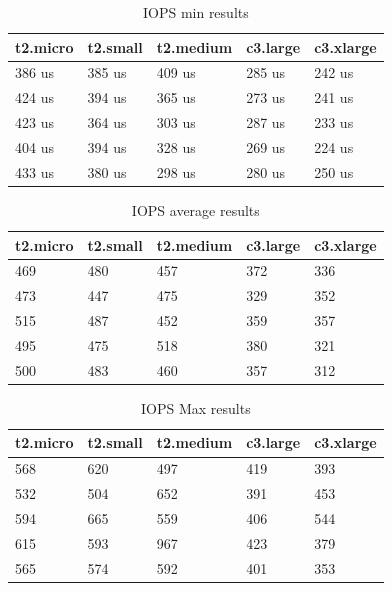 \documentclass[10pt, conference]{IEEEtran}
\begin{document}
\begin{center}
\begin{table}
\begin{center}
\begin{tabular}{|l|l|l|l|l|}
  \hline
t2.micro & t2.small & t2.medium & c3.large & c3.xlarge \\
\hline
386 us	& 385 us & 409 us & 285 us & 242 us \\
424 us & 394 us & 365 us & 273 us & 241 us \\
423 us & 	364 us & 303 us & 287 us & 233 us \\
404 us & 	394 us & 328 us & 269 us & 224 us \\
433 us & 	380 us & 298 us & 280 us & 250 us \\
\hline
\end{tabular}
\caption{\label{IOPSResultsMin} IOPS min results}
\end{center}
\end{table}
\end{center}

\begin{center}
\begin{table}
\begin{center}
\begin{tabular}{|l|l|l|l|l|}
  \hline
t2.micro & t2.small & 	t2.medium & 	c3.large & 	c3.xlarge \\
\hline 
469 & 	480 & 	457 & 	372 & 	336 \\
473 & 	447 & 	475 & 	329 & 	352 \\
515 & 	487 & 	452 & 	359 & 	357 \\
495 & 	475 & 	518 & 	380 & 	321 \\
500 & 	483 & 	460 & 	357 & 	312 \\
\hline
\end{tabular}
\caption{\label{IOPSResultsAvr} IOPS average results}
\end{center}
\end{table}
\end{center}


\begin{center}
\begin{table}
\begin{center}
\begin{tabular}{|l|l|l|l|l|}
  \hline
t2.micro & t2.small & 	t2.medium & 	c3.large & 	c3.xlarge \\
\hline 
568	& 	620	& 	497	& 	419	& 393 \\
532	& 	504	& 	652	& 	391	& 	453 \\
594	& 	665	& 	559	& 	406	& 	544 \\
615	& 	593	& 	967	& 	423	& 	379 \\
565	& 	574	& 	592	& 	401	& 	353 \\
\hline
\end{tabular}
\caption{\label{IOPSResultsMax} IOPS Max results}
\end{center}
\end{table}
\end{center}
\end{document}
